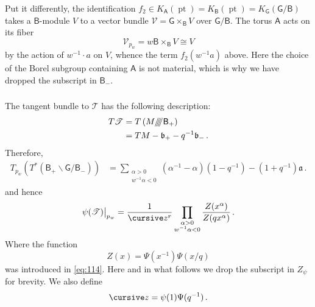 \documentclass[14pt]{extarticle}
\newcommand{\cz}{\textup{\small \cursive z}}
\newcommand{\bA}{\mathsf{A}}
\newcommand{\bG}{\mathsf{G}}
\newcommand{\bB}{\mathsf{B}}
\newcommand{\cV}{\mathscr{V}}
\newcommand{\fb}{\mathfrak{b}}
\newcommand{\rd}{/\!\!/\!\!/\!\!/}
\newcommand{\fa}{\mathfrak{a}}
\newcommand{\Tau}{\mathscr{T}}
\DeclareMathOperator{\pt}{pt}
\theoremstyle{definition}
\begin{document}
Put it differently, the identification $f_2 \in K_\bA(\pt) = K_{\bB}(\pt) =
K_\bG(\bG/\bB)$ takes a $\bB$-module $V$ to a vector bundle
$\cV = \bG \times_\bB V$ over $\bG/\bB$. The torus $\bA$ acts on
its fiber 
\[
  \cV_{p_w} = w \bB \times_\bB V \cong V 
\]
by the action of $w^{-1} \cdot a$ on $V$, whence the term $f_2(w^{-1} a)$ above. Here the choice of the Borel subgroup
containing $\bA$ is not material, which is why we have dropped the subscript
in $\bB_-$. 


\subsubsection{}

The tangent bundle to $\Tau$ has the following description: 
%
\begin{align}
  T \Tau &= T \left(M \rd \bB_+\right) \notag \\
  & = TM - \fb_+ - q^{-1} \fb_-  \,. \label{TTau} 
  \end{align}
%
Therefore,
%
\begin{align}
  \label{eq:51}
  T_{p_w} ( T^*(\bB_+ \backslash \bG / \bB_-)) 
  & = 
  \sum_{\substack{\alpha > 0 \\ w^{-1} \alpha <0 }} (\alpha^{-1} -
  \alpha)(1-q^{-1}) - (1+q^{-1}) \fa\,. 
\end{align}
%
and hence 
%
\begin{equation}
  \psi(\Tau) \big|_{p_w} = \frac{1}{\cz^r}  \prod_{\substack{\alpha > 0 \\ w^{-1} \alpha <0 }}
\frac{Z(x^\alpha)}{Z(q x^\alpha)}\,.  \label{eq:181-3}
\end{equation}
%
Where the function
%
\begin{equation}
  \label{eq:114bis}
Z(x) = \Psi(x^{-1}) \Psi(x/q)
\end{equation}
%
was introduced in \eqref{eq:114}. Here and in what follows we drop the
subscript in $Z_\psi$ for brevity. We also define
%
\begin{equation}
   \cz= \psi(1) \Psi(q^{-1}) \,.  \label{eq:23}
\end{equation}
%


\end{document}
